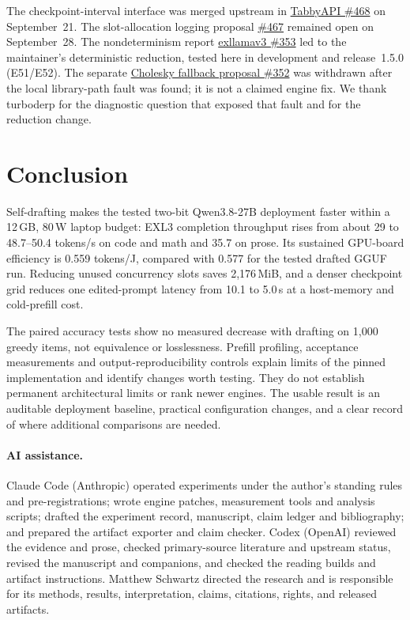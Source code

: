 \documentclass[11pt]{article}
\begin{document}
The checkpoint-interval interface was merged upstream in
\href{https://github.com/theroyallab/tabbyAPI/pull/468}{TabbyAPI \#468} on
September~21. The slot-allocation logging proposal
\href{https://github.com/theroyallab/tabbyAPI/pull/467}{\#467} remained open
on September~28. The nondeterminism report
\href{https://github.com/turboderp-org/exllamav3/issues/353}{exllamav3 \#353}
led to the maintainer's deterministic reduction, tested here in development
and release~1.5.0 (E51/E52). The separate
\href{https://github.com/turboderp-org/exllamav3/pull/352}{Cholesky fallback
proposal \#352} was withdrawn after the local library-path fault was found;
it is not a claimed engine fix. We thank turboderp for the diagnostic
question that exposed that fault and for the reduction change.

\section{Conclusion}

Self-drafting makes the tested two-bit Qwen3.8-27B deployment faster within
a 12\,GB, 80\,W laptop budget: EXL3 completion throughput rises from about 29 to
48.7--50.4 tokens/s on code and math and 35.7 on prose. Its sustained
GPU-board efficiency is 0.559 tokens/J, compared with 0.577 for the tested
drafted GGUF run. Reducing unused concurrency slots saves 2,176\,MiB, and
a denser checkpoint grid reduces one edited-prompt latency from 10.1 to
5.0\,s at a host-memory and cold-prefill cost.

The paired accuracy tests show no measured decrease with drafting on 1,000
greedy items, not equivalence or losslessness. Prefill profiling, acceptance
measurements and output-reproducibility controls explain limits of the
pinned implementation and identify changes worth testing. They do not
establish permanent architectural limits or rank newer engines. The usable
result is an auditable deployment baseline, practical configuration changes,
and a clear record of where additional comparisons are needed.

\paragraph{AI assistance.}
Claude Code (Anthropic) operated experiments under the author's standing
rules and pre-registrations; wrote engine patches, measurement tools and
analysis scripts; drafted the experiment record, manuscript, claim ledger
and bibliography; and prepared the artifact exporter and claim checker.
Codex (OpenAI) reviewed the evidence and prose, checked primary-source
literature and upstream status, revised the manuscript and companions, and
checked the reading builds and artifact instructions. Matthew Schwartz
directed the research and is responsible for its methods, results,
interpretation, claims, citations, rights, and released artifacts.
\end{document}
